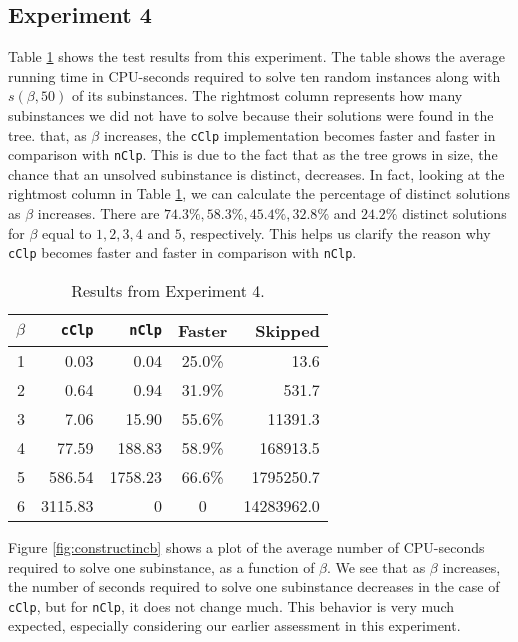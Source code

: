 \subsection*{Experiment 4}
Table \ref{table:exptwo} shows the test results from this experiment.
The table shows the average running time in CPU-seconds required to solve
ten random instances along with $s(\beta, 50)$ of its subinstances.
The rightmost column represents how many subinstances we did not have to
solve because their solutions were found in the tree.
that, as $\beta$ increases, the \texttt{cClp} implementation becomes
faster and faster in comparison with \texttt{nClp}.
This is due to the fact that as the tree grows in size, the chance that
an unsolved subinstance is distinct, decreases. In fact, looking at the
rightmost column in Table \ref{table:exptwo}, we can calculate the percentage
of distinct solutions as $\beta$ increases.
There are $74.3\%, 58.3\%, 45.4\%, 32.8\%$ and $24.2\%$ distinct solutions for
$\beta$ equal to $1,2,3,4$ and $5$, respectively. This helps us clarify the reason
why \texttt{cClp} becomes faster and faster in comparison with \texttt{nClp}.
\begin{table}[ht!]
\centering
\caption{Results from Experiment 4.}
\begin{tabular}{rrrcr}
      $\beta$ & \texttt{cClp} & \texttt{nClp} & Faster & Skipped\\ \hline
       1  & 0.03 & 0.04 & 25.0\% & 13.6 \\
       2  & 0.64 & 0.94 & 31.9\% & 531.7 \\
       3  & 7.06 & 15.90 & 55.6\% & 11391.3 \\
       4  & 77.59 & 188.83 & 58.9\% & 168913.5 \\
       5  & 586.54 & 1758.23 & 66.6\% & 1795250.7 \\
       6  & 3115.83 & 0      & 0      & 14283962.0
\end{tabular}
\label{table:exptwo}
\end{table}

Figure \ref{fig:constructincb} shows a plot of the average number of
CPU-seconds required to solve one subinstance, as a function of $\beta$.
We see that as $\beta$ increases, the number of seconds required to solve
one subinstance decreases in the case of \texttt{cClp},
but for \texttt{nClp}, it does not change much. This behavior is very
much expected, especially considering our earlier assessment in this
experiment.

